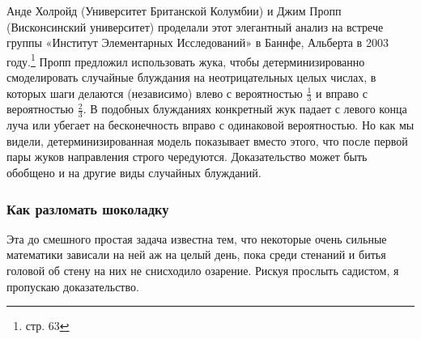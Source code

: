 Анде Холройд (Университет Британской Колумбии) и Джим Пропп (Висконсинский университет) проделали этот элегантный анализ на встрече группы «Институт Элементарных Исследований» в Баннфе, Альберта в 2003 году.\footnote{\href{https://www.birs.ca/files/scientific-reports/BIRS_SR_2003.pdf}{} стр. 63}
Пропп предложил использовать жука, чтобы детерминизированно смоделировать случайные блуждания на неотрицательных целых числах, в которых шаги делаются (независимо) влево с вероятностью $\tfrac13$ и вправо с вероятностью $\tfrac23$.
В подобных блужданиях конкретный жук падает с левого конца луча или убегает на бесконечность вправо с одинаковой вероятностью.
Но как мы видели, детерминизированная модель показывает вместо этого, что после первой пары жуков направления строго чередуются.
Доказательство может быть обобщено и на другие виды случайных блужданий.

\subsubsection*{Как разломать шоколадку}%

Эта до смешного простая задача известна тем, что некоторые очень сильные математики зависали на ней аж на целый день, пока среди стенаний и битья головой об стену на них не снисходило озарение.
Рискуя прослыть садистом, я пропускаю доказательство.

